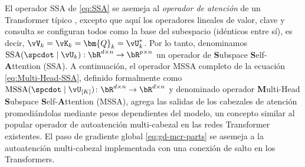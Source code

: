 \documentclass[../../book-main.tex]{subfiles}
\begin{document}
\begin{remark}
    El operador SSA de \eqref{eq:SSA} se asemeja al
    \textit{operador de atención} de un Transformer típico
    \citep{vaswani2017attention}, excepto que aquí los
    operadores lineales de valor, clave y consulta se configuran todos 
    como la base del subespacio (idénticos entre sí), es decir, $\vV_{k} = \vK_{k} =
    \bm{Q}_{k} = \vU_k^*$. Por lo tanto, denominamos
    $\mathrm{SSA}({\spcdot\mid\vU_k}): \bR^{d\times n} \rightarrow
    \bR^{p\times n}$  un operador de \textbf{S}ubspace
    \textbf{S}elf-\textbf{A}ttention (SSA). A continuación, el operador
    MSSA completo de la ecuación \eqref{eq:Multi-Head-SSA}, definido formalmente como
    \(\mathrm{MSSA}({\spcdot \mid \vU_{[K]}}) \colon \bR^{d \times n}
    \to \bR^{d \times n}\) y denominado operador \textbf{M}ulti-Head
    \textbf{S}ubspace \textbf{S}elf-\textbf{A}ttention (MSSA), agrega 
    las salidas de los cabezales de atención promediándolas
    mediante pesos dependientes del modelo, un concepto similar al popular
    operador de autoatención multi-cabezal en las redes Transformer
    existentes. El paso de gradiente global \eqref{eq:gd-mcr-parts}
    se asemeja a la autoatención multi-cabezal implementada con una conexión de salto
    en los Transformers.
\end{remark}
\end{document}
